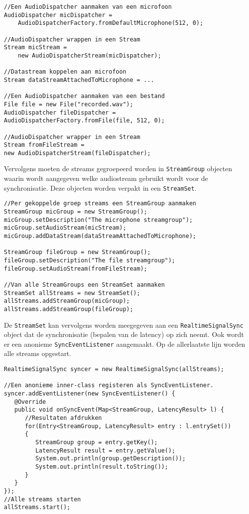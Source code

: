 \begin{lstlisting}
//Een AudioDispatcher aanmaken van een microfoon
AudioDispatcher micDispatcher =
	AudioDispatcherFactory.fromDefaultMicrophone(512, 0);

//AudioDispatcher wrappen in een Stream
Stream micStream = 
	new AudioDispatcherStream(micDispatcher);

//Datastream koppelen aan microfoon
Stream dataStreamAttachedToMicrophone = ...

//Een AudioDispatcher aanmaken van een bestand
File file = new File("recorded.wav");
AudioDispatcher fileDispatcher = 
AudioDispatcherFactory.fromFile(file, 512, 0);

//AudioDispatcher wrapper in een Stream
Stream fromFileStream = 
new AudioDispatcherStream(fileDispatcher);	
\end{lstlisting}
\newpage
Vervolgens moeten de streams gegroepeerd worden in \texttt{StreamGroup} objecten waarin wordt aangegeven welke audiostream gebruikt wordt voor de synchronisatie. Deze objecten worden verpakt in een \texttt{StreamSet}. \\

\begin{lstlisting}
//Per gekoppelde groep streams een StreamGroup aanmaken
StreamGroup micGroup = new StreamGroup();
micGroup.setDescription("The microphone streamgroup");
micGroup.setAudioStream(micStream);
micGroup.addDataStream(dataStreamAttachedToMicrophone);

StreamGroup fileGroup = new StreamGroup();
fileGroup.setDescription("The file streamgroup");
fileGroup.setAudioStream(fromFileStream);

//Van alle StreamGroups een StreamSet aanmaken
StreamSet allStreams = new StreamSet();
allStreams.addStreamGroup(micGroup);
allStreams.addStreamGroup(fileGroup);
\end{lstlisting}

De \texttt{StreamSet} kan vervolgens worden meegegeven aan een \texttt{RealtimeSignalSync} object dat de synchronisatie (bepalen van de latency) op zich neemt. Ook wordt er een anonieme \texttt{SyncEventListener} aangemaakt. Op de allerlaatste lijn worden alle streams opgestart.  \\

\begin{lstlisting}
RealtimeSignalSync syncer = new RealtimeSignalSync(allStreams);

//Een anonieme inner-class registeren als SyncEventListener.
syncer.addEventListener(new SyncEventListener() {
   @Override
   public void onSyncEvent(Map<StreamGroup, LatencyResult> l) {
      //Resultaten afdrukken
      for(Entry<StreamGroup, LatencyResult> entry : l.entrySet()) 
      {
         StreamGroup group = entry.getKey();
         LatencyResult result = entry.getValue();
         System.out.println(group.getDescription());
         System.out.println(result.toString());
      }
   }
});
//Alle streams starten
allStreams.start();
\end{lstlisting}

